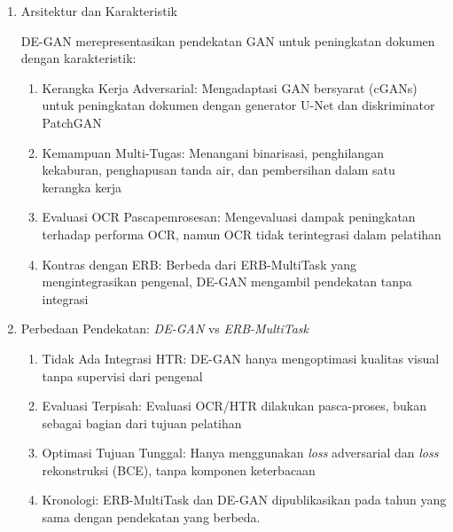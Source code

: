 \begin{enumerate}[leftmargin=*, labelindent=0pt, itemsep=1ex, topsep=0pt]

\item Arsitektur dan Karakteristik
\label{para:degan-arsitektur}

DE-GAN merepresentasikan pendekatan GAN untuk peningkatan dokumen dengan karakteristik:

\begin{enumerate}[leftmargin=1.5em, labelsep=0.5em, itemindent=0pt, label=\alph*., topsep=0pt, parsep=0pt, itemsep=0pt]
      \item Kerangka Kerja Adversarial: Mengadaptasi GAN bersyarat (cGANs) untuk peningkatan dokumen dengan generator U-Net dan diskriminator PatchGAN
      \item Kemampuan Multi-Tugas: Menangani binarisasi, penghilangan kekaburan, penghapusan tanda air, dan pembersihan dalam satu kerangka kerja
      \item Evaluasi OCR Pascapemrosesan: Mengevaluasi dampak peningkatan terhadap performa OCR, namun OCR tidak terintegrasi dalam pelatihan
      \item Kontras dengan ERB: Berbeda dari ERB-MultiTask \parencite{souibgui2021erb} yang mengintegrasikan pengenal, DE-GAN mengambil pendekatan tanpa integrasi
\end{enumerate}

\item Perbedaan Pendekatan: \textit{DE-GAN} vs \textit{ERB-MultiTask}
\label{para:degan-perbedaan}

\begin{enumerate}[leftmargin=1.5em, labelsep=0.5em, itemindent=0pt, label=\alph*., topsep=0pt, parsep=0pt, itemsep=0pt]
      \item Tidak Ada Integrasi HTR: DE-GAN hanya mengoptimasi kualitas visual tanpa supervisi dari pengenal
      \item Evaluasi Terpisah: Evaluasi OCR/HTR dilakukan pasca-proses, bukan sebagai bagian dari tujuan pelatihan
      \item Optimasi Tujuan Tunggal: Hanya menggunakan \textit{loss} adversarial dan \textit{loss} rekonstruksi (BCE), tanpa komponen keterbacaan
      \item Kronologi: ERB-MultiTask dan DE-GAN dipublikasikan pada tahun yang sama dengan pendekatan yang berbeda.
\end{enumerate}

\end{enumerate}

